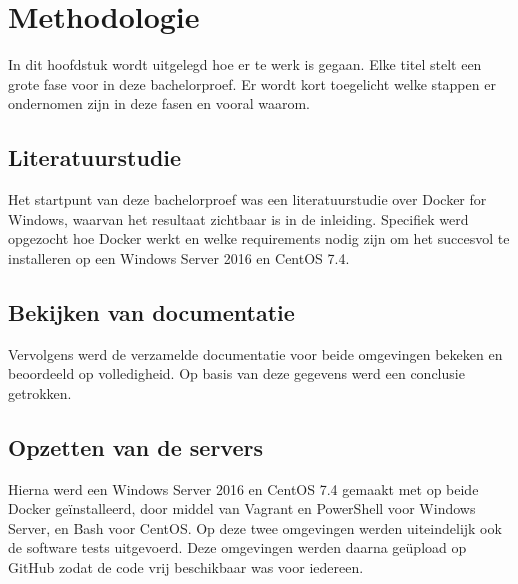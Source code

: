 
\chapter{Methodologie}
\label{ch:methodologie}


In dit hoofdstuk wordt uitgelegd hoe er te werk is gegaan. Elke titel stelt een grote fase voor in deze bachelorproef. Er wordt kort toegelicht welke stappen er ondernomen zijn in deze fasen en vooral waarom.

\section{Literatuurstudie}
Het startpunt van deze bachelorproef was een literatuurstudie over Docker for Windows, waarvan het resultaat zichtbaar is in de inleiding. Specifiek werd opgezocht hoe Docker werkt en welke requirements nodig zijn om het succesvol te installeren op een Windows Server 2016 en CentOS 7.4.

\section{Bekijken van documentatie}
Vervolgens werd de verzamelde documentatie voor beide omgevingen bekeken en beoordeeld op volledigheid. Op basis van deze gegevens werd een conclusie getrokken.

\section{Opzetten van de servers}
Hierna werd een Windows Server 2016 en CentOS 7.4 gemaakt met op beide Docker geïnstalleerd, door middel van Vagrant en PowerShell voor Windows Server, en Bash voor CentOS. Op deze twee omgevingen werden uiteindelijk ook de software tests uitgevoerd. Deze omgevingen werden daarna geüpload op GitHub zodat de code vrij beschikbaar was voor iedereen.

